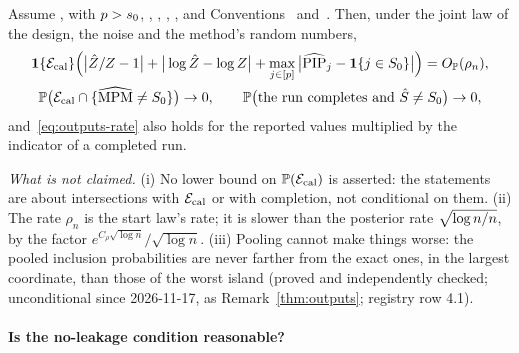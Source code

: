 \begin{remark}\label{thm:outputs}
Assume ,  with $p>s_0$, , , , , and Conventions~ and~. Then,
under the joint law of the design, the noise and the method's random numbers,
\begin{gather}
  \mathbf{1}\{\mathcal E_{\mathrm{cal}}\}\Big(\big|\hat Z/Z-1\big|+\big|\log\hat Z-\log Z\big|+\max_{j\in[p]}\big|\widehat{\mathrm{PIP}}_j-\mathbf{1}\{j\in S_0\}\big|\Big)
    =O_{\mathbb{P}}(\rho_n),\label{eq:outputs-rate}\\
  \mathbb{P}\big(\mathcal E_{\mathrm{cal}}\cap\{\widehat{\mathrm{MPM}}\neq S_0\}\big)\to0,\qquad \mathbb{P}\big(\text{the run completes and }\hat S\neq S_0\big)\to0,
    \label{eq:outputs-sel}
\end{gather}
and~\eqref{eq:outputs-rate} also holds for the reported values multiplied by the indicator of a completed run.
\end{remark}



\par\noindent\textit{What is not claimed.}\label{rem:outputs}
(i) No lower bound on $\mathbb{P}(\mathcal E_{\mathrm{cal}})$ is asserted: the statements are about intersections with $\mathcal E_{\mathrm{cal}}$ or with completion, not
conditional on them.
(ii) The rate $\rho_n$ is the start law's rate; it is slower than the posterior rate $\sqrt{\log n/n}$, by the factor
$e^{C_\rho\sqrt{\log n}}/\sqrt{\log n}$.
(iii) Pooling cannot make things worse: the pooled inclusion probabilities are never farther from the exact ones, in the
largest coordinate, than those of the worst island (proved and independently checked; unconditional since 2026-11-17, as
Remark~\ref{thm:outputs}; registry row 4.1).

\paragraph{Is the no-leakage condition reasonable?}\label{sec:a-pe}

